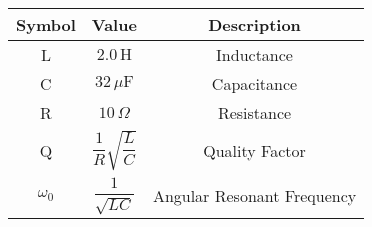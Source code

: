 
\begin{tabular}{|c|c|c|}
    \hline
     \textbf{Symbol} & \textbf{Value} &
     \textbf{Description}\\
    \hline
     L &  $2.0\,
     \text{H}$ & Inductance\\
    \hline 
     C &  $32\, \mu\text{F}$ & Capacitance \\
    \hline
     R &  $10\, \Omega$ & Resistance\\
    \hline
     Q & $\dfrac{1}{R}\sqrt{\dfrac{L}{C}}$ & Quality Factor\\[6pt]
    \hline
     $\omega_0$ & $\dfrac{1}{\sqrt{LC}}$ & Angular Resonant Frequency\\[8pt]
    \hline
\end{tabular}

